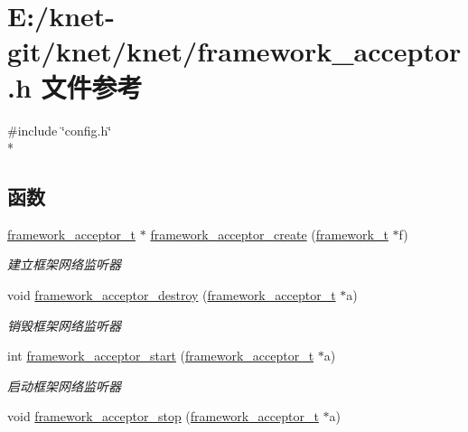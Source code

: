 \hypertarget{a00051}{}\section{E\+:/knet-\/git/knet/knet/framework\+\_\+acceptor.h 文件参考}
\label{a00051}
{\ttfamily \#include \char`\"{}config.\+h\char`\"{}}\\*
\subsection*{函数}
\begin{DoxyCompactItemize}
\item 
\hyperlink{a00047_ab0952db3c97c4760192720875e69d040_ab0952db3c97c4760192720875e69d040}{framework\+\_\+acceptor\+\_\+t} $\ast$ \hyperlink{a00051_a09f38093fc07ac67eb32a2d73d01ac00_a09f38093fc07ac67eb32a2d73d01ac00}{framework\+\_\+acceptor\+\_\+create} (\hyperlink{a00047_a6149d769f6f07ed14a40a271c95d8463_a6149d769f6f07ed14a40a271c95d8463}{framework\+\_\+t} $\ast$f)
\begin{DoxyCompactList}\small\item\em 建立框架网络监听器 \end{DoxyCompactList}\item 
void \hyperlink{a00051_a8547ef8ed59bf8fc10ce491cbc2e0e7d_a8547ef8ed59bf8fc10ce491cbc2e0e7d}{framework\+\_\+acceptor\+\_\+destroy} (\hyperlink{a00047_ab0952db3c97c4760192720875e69d040_ab0952db3c97c4760192720875e69d040}{framework\+\_\+acceptor\+\_\+t} $\ast$a)
\begin{DoxyCompactList}\small\item\em 销毁框架网络监听器 \end{DoxyCompactList}\item 
int \hyperlink{a00051_ae7af7233800a87f2719ba257be3fe738_ae7af7233800a87f2719ba257be3fe738}{framework\+\_\+acceptor\+\_\+start} (\hyperlink{a00047_ab0952db3c97c4760192720875e69d040_ab0952db3c97c4760192720875e69d040}{framework\+\_\+acceptor\+\_\+t} $\ast$a)
\begin{DoxyCompactList}\small\item\em 启动框架网络监听器 \end{DoxyCompactList}\item 
void \hyperlink{a00051_a53e38c44cdc8c84a57728a7f8e41dc27_a53e38c44cdc8c84a57728a7f8e41dc27}{framework\+\_\+acceptor\+\_\+stop} (\hyperlink{a00047_ab0952db3c97c4760192720875e69d040_ab0952db3c97c4760192720875e69d040}{framework\+\_\+acceptor\+\_\+t} $\ast$a)

\end{DoxyCompactItemize}
